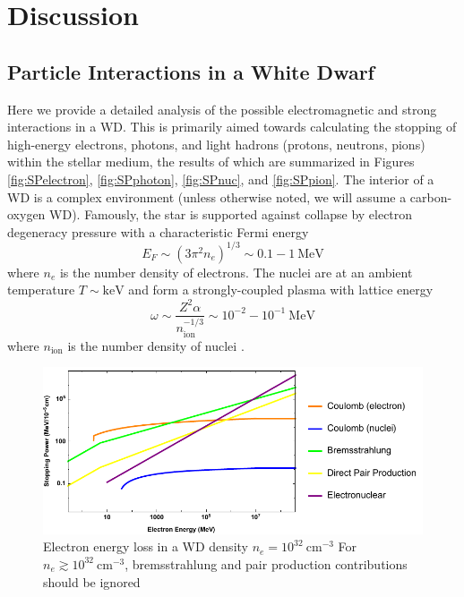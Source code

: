 \documentclass[twocolumn,showpacs,preprintnumbers,amsmath,amssymb,prd]{revtex4}
\begin{document}
\section{Discussion}
\label{sec:Discussion}

\begin{appendices}

\section{Particle Interactions in a White Dwarf}
\label{sec:appendix}
Here we provide a detailed analysis of the possible electromagnetic and strong interactions in a WD.
This is primarily aimed towards calculating the stopping of high-energy electrons, photons, and light hadrons (protons, neutrons, pions) within the stellar medium, the results of which are summarized in Figures \ref{fig:SPelectron}, \ref{fig:SPphoton}, \ref{fig:SPnuc}, and \ref{fig:SPpion}.
The interior of a WD is a complex environment (unless otherwise noted, we will assume a carbon-oxygen WD).
Famously, the star is supported against collapse by electron degeneracy pressure with a characteristic Fermi energy
\begin{equation}
E_F \sim (3 \pi^2 n_e)^{1/3} \sim 0.1 - 1 ~\text{MeV}
\end{equation}
where $n_e$ is the number density of electrons.
The nuclei are at an ambient temperature $T \sim \text{keV}$ and form a strongly-coupled plasma with lattice energy
\begin{equation}
\label{eq:lattice}
\omega \sim \frac{Z^2 \alpha}{n_\text{ion}^{-1/3}} \sim 10^{-2} - 10^{-1} ~\text{MeV}
\end{equation}
where $n_\text{ion}$ is the number density of nuclei \cite{Teukolsky}. 
\begin{figure}
\includegraphics[scale=.45]{SPelectron.pdf}
\caption{Electron energy loss in a WD density $n_e = 10^{32} ~\text{cm}^{-3}$ For $n_e \gtrsim 10^{32} ~\text{cm}^{-3}$, bremsstrahlung and pair production contributions should be ignored}

\end{figure}
\end{appendices}
\end{document}
